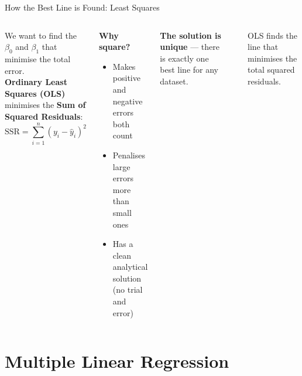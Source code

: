 \documentclass[aspectratio=169,10pt]{beamer}
\begin{document}
\begin{frame}{How the Best Line is Found: Least Squares}
  \begin{columns}
      We want to find the $\beta_0$ and $\beta_1$ that minimise the total error.\\[8pt]
      \textbf{Ordinary Least Squares (OLS)} minimises the
      \textbf{Sum of Squared Residuals}:
      \[
        \text{SSR} = \sum_{i=1}^{n}(y_i - \hat{y}_i)^2
      \]
      \begin{tcolorbox}[mybox]
        \small\textbf{Why square?}
        \begin{itemize}
          \item Makes positive and negative errors both count
          \item Penalises large errors more than small ones
          \item Has a clean analytical solution (no trial and error)
        \end{itemize}
      \end{tcolorbox}
      \vspace{0.2cm}
      \small\textbf{The solution is unique} --- there is exactly one best line
      for any dataset.
      \begin{center}
      \end{center}
      \small\centering OLS finds the line that minimises the total squared residuals.
  \end{columns}
\end{frame}

\section{Multiple Linear Regression}
\end{document}
